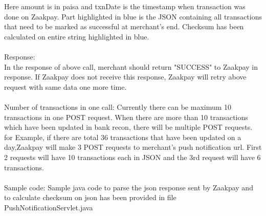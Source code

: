 \documentclass{article}
\begin{document}
Here   amount   is   in   paisa   and   txnDate   is   the   timestamp   when   transaction   was   done   on   Zaakpay.   Part   highlighted   in   blue   is   the   JSON   containing   all   transactions   that   need   to   be   marked   as   successful   at   merchant’s   end.   Checksum   has been calculated on entire string highlighted in blue.  \\ \\
Response: 
\\
In   the   response   of   above   call,   merchant   should   return   "SUCCESS"   to   Zaakpay   in   response.   If   Zaakpay   does   not  receive this response, Zaakpay will retry above request  with same data one more time.
\\ \\ Number   of   transactions   in   one   call:   Currently   there   can   be   maximum   10   transactions   in   one   POST   request.   When   there   are   more   than   10   transactions   which   have   been   updated   in   bank   recon,   there   will   be   multiple   POST   requests. for Example, if there are total 36 transactions that have been updated on a day,Zaakpay will make 3  POST   requests   to   merchant's   push   notification   url.   First   2   requests   will   have   10   transactions   each   in   JSON and the 3rd request will have 6 transactions. 
\\ \\ 
Sample   code:   Sample   java   code   to   parse   the   json   response   sent   by   Zaakpay   and   to   calculate   checksum   on   json has been provided in file PushNotificationServlet.java 
\end{document}
